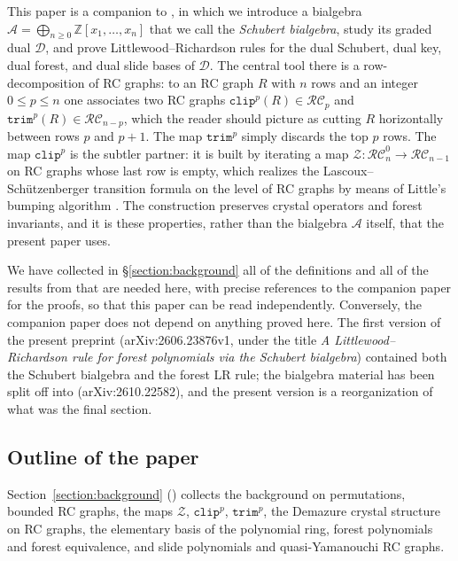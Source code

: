 \documentclass[pdflatex,sn-mathphys-num]{sn-jnl}
\numberwithin{equation}{subsection}
\newcommand{\trm}{\mathtt{trim}}
\newcommand{\zeromap}{\mathcal{Z}}
\newcommand{\clp}{\mathtt{clip}}
\newcommand{\RC}{\mathcal{RC}}
\newcommand{\coma}{\mathcal{A}}
\newcommand{\dcoma}{\mathcal{D}}
\theoremstyle{thmstyleone}
\theoremstyle{thmstylethree}
\theoremstyle{thmstyletwo}
\begin{document}
This paper is a companion to \cite{samuelbialgebra}, in which we introduce a bialgebra $\coma=\bigoplus_{n\geq 0}\mathbb{Z}[x_1,\ldots,x_n]$ that we call the \emph{Schubert bialgebra}, study its graded dual $\dcoma$, and prove Littlewood--Richardson rules for the dual Schubert, dual key, dual forest, and dual slide bases of $\dcoma$. The central tool there is a row-decomposition of RC graphs: to an RC graph $R$ with $n$ rows and an integer $0\leq p\leq n$ one associates two RC graphs $\clp^p(R)\in\RC_p$ and $\trm^p(R)\in\RC_{n-p}$, which the reader should picture as cutting $R$ horizontally between rows $p$ and $p+1$. The map $\trm^p$ simply discards the top $p$ rows. The map $\clp^p$ is the subtler partner: it is built by iterating a map $\zeromap:\RC_n^0\to\RC_{n-1}$ on RC graphs whose last row is empty, which realizes the Lascoux--Sch\"utzenberger transition formula on the level of RC graphs by means of Little's bumping algorithm \cite{little2003combinatorial}. The construction preserves crystal operators and forest invariants, and it is these properties, rather than the bialgebra $\coma$ itself, that the present paper uses.

We have collected in \S\ref{section:background} all of the definitions and all of the results from \cite{samuelbialgebra} that are needed here, with precise references to the companion paper for the proofs, so that this paper can be read independently. Conversely, the companion paper does not depend on anything proved here. The first version of the present preprint (arXiv:2606.23876v1, under the title \emph{A Littlewood--Richardson rule for forest polynomials via the Schubert bialgebra}) contained both the Schubert bialgebra and the forest LR rule; the bialgebra material has been split off into \cite{samuelbialgebra} (arXiv:2610.22582), and the present version is a reorganization of what was the final section.

\subsection*{Outline of the paper}

Section~\ref{section:background} () collects the background on permutations, bounded RC graphs, the maps $\zeromap$, $\clp^p$, $\trm^p$, the Demazure crystal structure on RC graphs, the elementary basis of the polynomial ring, forest polynomials and forest equivalence, and slide polynomials and quasi-Yamanouchi RC graphs.
\end{document}
